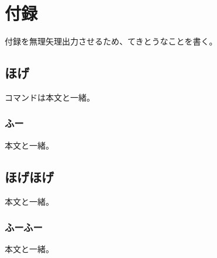 \chapter{付録}\label{chap:appendix}

付録を無理矢理出力させるため、てきとうなことを書く。

\section{ほげ}\label{ux307bux3052}

コマンドは本文と一緒。

\subsection{ふー}\label{ux3075ux30fc}

本文と一緒。

\section{ほげほげ}\label{ux307bux3052ux307bux3052}

本文と一緒。

\subsection{ふーふー}\label{ux3075ux30fcux3075ux30fc}

本文と一緒。
